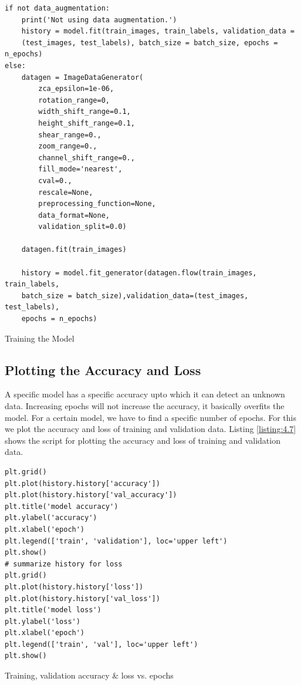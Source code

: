 \begin{longlisting}
    \begin{verbatim}
if not data_augmentation:
    print('Not using data augmentation.')
    history = model.fit(train_images, train_labels, validation_data =
    (test_images, test_labels), batch_size = batch_size, epochs = n_epochs)
else:
    datagen = ImageDataGenerator(
        zca_epsilon=1e-06,
        rotation_range=0,  
        width_shift_range=0.1,
        height_shift_range=0.1,
        shear_range=0.,
        zoom_range=0.,
        channel_shift_range=0.,
        fill_mode='nearest',
        cval=0.,
        rescale=None,
        preprocessing_function=None,
        data_format=None,
        validation_split=0.0)
    
    datagen.fit(train_images)
    
    history = model.fit_generator(datagen.flow(train_images, train_labels,
    batch_size = batch_size),validation_data=(test_images, test_labels),
    epochs = n_epochs)    
    \end{verbatim}
    \caption{Training the Model}
\label{listing:4.6}
\end{longlisting}
\subsection{Plotting the Accuracy and Loss}
A specific model has a specific accuracy upto which it can detect an unknown data.
Increasing epochs will not increase the accuracy, it basically overfits
the model. For a certain model, we have to find a specific number
of epochs. For this we plot the accuracy and loss of training and
validation data. Listing \ref{listing:4.7} shows the script for plotting the accuracy and
loss of training and validation data.

\begin{longlisting}
    \begin{verbatim}
plt.grid()
plt.plot(history.history['accuracy'])
plt.plot(history.history['val_accuracy'])
plt.title('model accuracy')
plt.ylabel('accuracy')
plt.xlabel('epoch')
plt.legend(['train', 'validation'], loc='upper left')
plt.show()
# summarize history for loss
plt.grid()
plt.plot(history.history['loss'])
plt.plot(history.history['val_loss'])
plt.title('model loss')
plt.ylabel('loss')
plt.xlabel('epoch')
plt.legend(['train', 'val'], loc='upper left')
plt.show()
\end{verbatim}
\caption{Training, validation accuracy \& loss vs. epochs}
\label{listing:4.7}
\end{longlisting}

